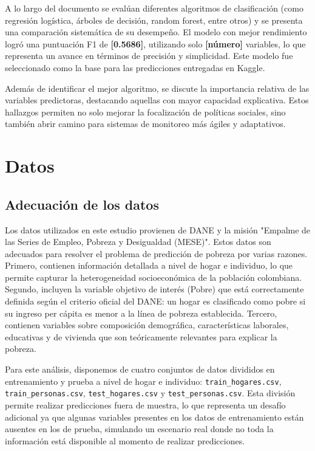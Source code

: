 \documentclass[12pt,a4paper,onecolumn]{article}
\begin{document}
A lo largo del documento se evalúan diferentes algoritmos de clasificación (como regresión logística, árboles de decisión, random forest, entre otros) y se presenta una comparación sistemática de su desempeño. El modelo con mejor rendimiento logró una puntuación F1 de \textbf{[0.5686]}, utilizando solo \textbf{[número]} variables, lo que representa un avance en términos de precisión y simplicidad. Este modelo fue seleccionado como la base para las predicciones entregadas en Kaggle.

Además de identificar el mejor algoritmo, se discute la importancia relativa de las variables predictoras, destacando aquellas con mayor capacidad explicativa. Estos hallazgos permiten no solo mejorar la focalización de políticas sociales, sino también abrir camino para sistemas de monitoreo más ágiles y adaptativos.

\section{Datos}
\subsection{Adecuación de los datos}

Los datos utilizados en este estudio provienen de DANE y la misión "Empalme de las Series de Empleo, Pobreza y Desigualdad (MESE)". Estos datos son adecuados para resolver el problema de predicción de pobreza por varias razones. Primero, contienen información detallada a nivel de hogar e individuo, lo que permite capturar la heterogeneidad socioeconómica de la población colombiana. Segundo, incluyen la variable objetivo de interés (Pobre) que está correctamente definida según el criterio oficial del DANE: un hogar es clasificado como pobre si su ingreso per cápita es menor a la línea de pobreza establecida. Tercero, contienen variables sobre composición demográfica, características laborales, educativas y de vivienda que son teóricamente relevantes para explicar la pobreza.

Para este análisis, disponemos de cuatro conjuntos de datos divididos en entrenamiento y prueba a nivel de hogar e individuo: \texttt{train\_hogares.csv}, \texttt{train\_personas.csv}, \texttt{test\_hogares.csv} y \texttt{test\_personas.csv}. Esta división permite realizar predicciones fuera de muestra, lo que representa un desafío adicional ya que algunas variables presentes en los datos de entrenamiento están ausentes en los de prueba, simulando un escenario real donde no toda la información está disponible al momento de realizar predicciones.
\end{document}
